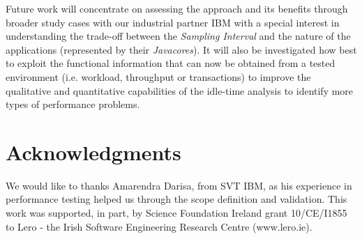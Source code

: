 \documentclass[runningheads,a4paper]{llncs}
\begin{document}
Future work will concentrate on assessing the approach and its benefits through
broader study cases with our industrial partner IBM with a special interest in
understanding the trade-off between the \emph{Sampling Interval} and the nature
of the applications (represented by their \emph{Javacores}). It will also be
investigated how best to exploit the functional information that can now be
obtained from a tested environment (i.e. workload, throughput or transactions)
to improve the qualitative and quantitative capabilities of the idle-time
analysis to identify more types of performance problems.

\vspace{-5pt}
\section*{Acknowledgments}
\vspace{-5pt}
We would like to thanks Amarendra Darisa, from SVT IBM, as his experience in
performance testing helped us through the scope definition and validation. This
work was supported, in part, by Science Foundation Ireland grant 10/CE/I1855 to Lero - the Irish Software Engineering Research Centre (www.lero.ie).




\end{document}
